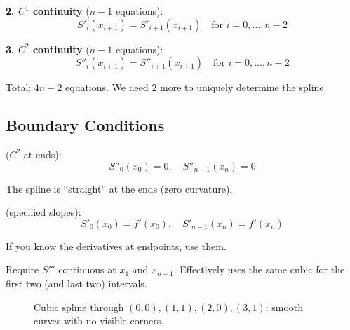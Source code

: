 \textbf{2. $C^1$ continuity} ($n-1$ equations):
\begin{equation}
    S'_i(x_{i+1}) = S'_{i+1}(x_{i+1}) \quad \text{for } i = 0, \ldots, n-2
\end{equation}

\textbf{3. $C^2$ continuity} ($n-1$ equations):
\begin{equation}
    S''_i(x_{i+1}) = S''_{i+1}(x_{i+1}) \quad \text{for } i = 0, \ldots, n-2
\end{equation}

Total: $4n - 2$ equations. We need 2 more to uniquely determine the spline.



\subsection{Boundary Conditions}

 ($C^2$ at ends):
\begin{equation}
    S''_0(x_0) = 0, \quad S''_{n-1}(x_n) = 0
\end{equation}

The spline is ``straight'' at the ends (zero curvature).

 (specified slopes):
\begin{equation}
    S'_0(x_0) = f'(x_0), \quad S'_{n-1}(x_n) = f'(x_n)
\end{equation}

If you know the derivatives at endpoints, use them.

Require $S'''$ continuous at $x_1$ and $x_{n-1}$. Effectively uses the same cubic for the first two (and last two) intervals.

\begin{figure}[h]
    \centering
    \caption{Cubic spline through $(0,0), (1,1), (2,0), (3,1)$: smooth curves with no visible corners.}
    \label{fig:cubic_spline}
\end{figure}




